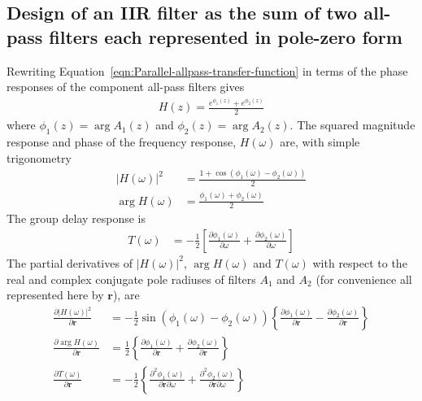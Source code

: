 \documentclass[a4paper,twoside,10pt,english]{report}
\begin{document}
\subsection{\label{sec:Design-IIR-filter-sum-all-pass-filters-pole-zero}Design of an IIR filter as the sum of two all-pass filters each represented in pole-zero form}
Rewriting Equation~\ref{eqn:Parallel-allpass-transfer-function} in terms of
the phase responses of the component all-pass filters gives
\begin{align*}
  H\left(z\right)=\frac{e^{\phi_{1}\left(z\right)}+e^{\phi_{2}\left(z\right)}}{2}
\end{align*}
where $\phi_{1}\left(z\right)=\arg A_{1}\left(z\right)$ and 
$\phi_{2}\left(z\right)=\arg A_{2}\left(z\right)$. The squared magnitude
response and phase of the frequency response, $H\left(\omega\right)$ are, 
with simple trigonometry
\begin{align*}
\left|H\left(\omega\right)\right|^{2} &=
\frac{1+\cos\left(\phi_{1}\left(\omega\right)-
                  \phi_{2}\left(\omega\right)\right)}{2}\\
\arg H\left(\omega\right) &=
\frac{\phi_{1}\left(\omega\right)+\phi_{2}\left(\omega\right)}{2}
\end{align*}
The group delay response is
\begin{align*}
T\left(\omega\right) &= 
-\frac{1}{2}\left[
\frac{\partial\phi_{1}\left(\omega\right)}{\partial\omega}+
\frac{\partial\phi_{2}\left(\omega\right)}{\partial\omega}
\right]
\end{align*}
The partial derivatives of $\left|H\left(\omega\right)\right|^{2}$,
$\arg H\left(\omega\right)$ and $T\left(\omega\right)$ with respect to the 
real and complex conjugate pole radiuses of filters $A_{1}$ and $A_{2}$ 
(for convenience all represented here by $\boldsymbol{r}$), are
\begin{align*}
\frac{\partial \left|H\left(\omega\right)\right|^{2}}{\partial\boldsymbol{r}} &=
  -\frac{1}{2}\sin\left(\phi_{1}\left(\omega\right)-
                        \phi_{2}\left(\omega\right)\right)\left\{
  \frac{\partial\phi_{1}\left(\omega\right)}{\partial\boldsymbol{r}}-
  \frac{\partial\phi_{2}\left(\omega\right)}{\partial\boldsymbol{r}}\right\} \\
\frac{\partial \arg H\left(\omega\right)}{\partial\boldsymbol{r}} &=
  \frac{1}{2}\left\{
  \frac{\partial\phi_{1}\left(\omega\right)}{\partial\boldsymbol{r}}+
  \frac{\partial\phi_{2}\left(\omega\right)}{\partial\boldsymbol{r}}\right\}\\
\frac{\partial T\left(\omega\right)}{\partial\boldsymbol{r}} &=
-\frac{1}{2}\left\{\frac{\partial^{2}\phi_{1}\left(\omega\right)}
                        {\partial\boldsymbol{r}\partial\omega} +
                   \frac{\partial^{2}\phi_{2}\left(\omega\right)}
                        {\partial\boldsymbol{r}\partial\omega}\right\}
\end{align*}
\end{document}
